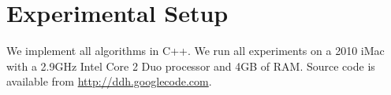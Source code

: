 \section{Experimental Setup}
\label{sec::setup}
We implement all algorithms in C++. We run all experiments on a 2010 iMac 
with a 2.9GHz Intel Core 2 Duo processor and 4GB of RAM.
Source code is available from \url{http://ddh.googlecode.com}.
